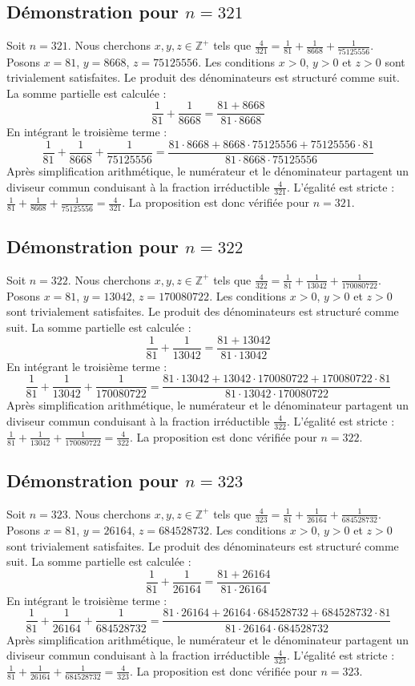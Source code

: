 \documentclass[11pt,a4paper]{article}
\begin{document}
\subsection{Démonstration pour $n = 321$}
Soit $n = 321$. Nous cherchons $x, y, z \in \mathbb{Z}^{+}$ tels que $\frac{4}{321} = \frac{1}{81} + \frac{1}{8668} + \frac{1}{75125556}$.
Posons $x = 81$, $y = 8668$, $z = 75125556$.
Les conditions $x > 0$, $y > 0$ et $z > 0$ sont trivialement satisfaites.
Le produit des dénominateurs est structuré comme suit. La somme partielle est calculée :
$$ \frac{1}{81} + \frac{1}{8668} = \frac{81+8668}{81 \cdot 8668} $$
En intégrant le troisième terme :
$$ \frac{1}{81} + \frac{1}{8668} + \frac{1}{75125556} = \frac{81 \cdot 8668 + 8668 \cdot 75125556 + 75125556 \cdot 81}{81 \cdot 8668 \cdot 75125556} $$
Après simplification arithmétique, le numérateur et le dénominateur partagent un diviseur commun conduisant à la fraction irréductible $\frac{4}{321}$.
L'égalité est stricte : $\frac{1}{81} + \frac{1}{8668} + \frac{1}{75125556} = \frac{4}{321}$.
La proposition est donc vérifiée pour $n = 321$.
\subsection{Démonstration pour $n = 322$}
Soit $n = 322$. Nous cherchons $x, y, z \in \mathbb{Z}^{+}$ tels que $\frac{4}{322} = \frac{1}{81} + \frac{1}{13042} + \frac{1}{170080722}$.
Posons $x = 81$, $y = 13042$, $z = 170080722$.
Les conditions $x > 0$, $y > 0$ et $z > 0$ sont trivialement satisfaites.
Le produit des dénominateurs est structuré comme suit. La somme partielle est calculée :
$$ \frac{1}{81} + \frac{1}{13042} = \frac{81+13042}{81 \cdot 13042} $$
En intégrant le troisième terme :
$$ \frac{1}{81} + \frac{1}{13042} + \frac{1}{170080722} = \frac{81 \cdot 13042 + 13042 \cdot 170080722 + 170080722 \cdot 81}{81 \cdot 13042 \cdot 170080722} $$
Après simplification arithmétique, le numérateur et le dénominateur partagent un diviseur commun conduisant à la fraction irréductible $\frac{4}{322}$.
L'égalité est stricte : $\frac{1}{81} + \frac{1}{13042} + \frac{1}{170080722} = \frac{4}{322}$.
La proposition est donc vérifiée pour $n = 322$.
\subsection{Démonstration pour $n = 323$}
Soit $n = 323$. Nous cherchons $x, y, z \in \mathbb{Z}^{+}$ tels que $\frac{4}{323} = \frac{1}{81} + \frac{1}{26164} + \frac{1}{684528732}$.
Posons $x = 81$, $y = 26164$, $z = 684528732$.
Les conditions $x > 0$, $y > 0$ et $z > 0$ sont trivialement satisfaites.
Le produit des dénominateurs est structuré comme suit. La somme partielle est calculée :
$$ \frac{1}{81} + \frac{1}{26164} = \frac{81+26164}{81 \cdot 26164} $$
En intégrant le troisième terme :
$$ \frac{1}{81} + \frac{1}{26164} + \frac{1}{684528732} = \frac{81 \cdot 26164 + 26164 \cdot 684528732 + 684528732 \cdot 81}{81 \cdot 26164 \cdot 684528732} $$
Après simplification arithmétique, le numérateur et le dénominateur partagent un diviseur commun conduisant à la fraction irréductible $\frac{4}{323}$.
L'égalité est stricte : $\frac{1}{81} + \frac{1}{26164} + \frac{1}{684528732} = \frac{4}{323}$.
La proposition est donc vérifiée pour $n = 323$.
\end{document}
